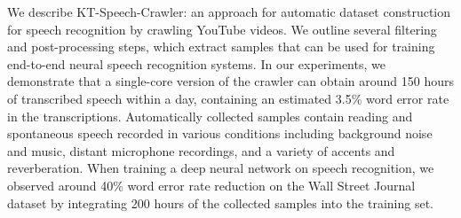 We describe KT-Speech-Crawler: an approach for automatic dataset construction for speech recognition by crawling YouTube videos. We outline several filtering and post-processing steps, which extract samples that can be used for training end-to-end neural speech recognition systems. In our experiments, we demonstrate that a single-core version of the crawler can obtain around 150 hours of transcribed speech within a day, containing an estimated 3.5\% word error rate in the transcriptions. Automatically collected samples contain reading and spontaneous speech recorded in various conditions including background noise and music, distant microphone recordings, and a variety of accents and reverberation. When training a deep neural network on speech recognition, we observed around 40\% word error rate reduction on the Wall Street Journal dataset by integrating 200 hours of the collected samples into the training set.
